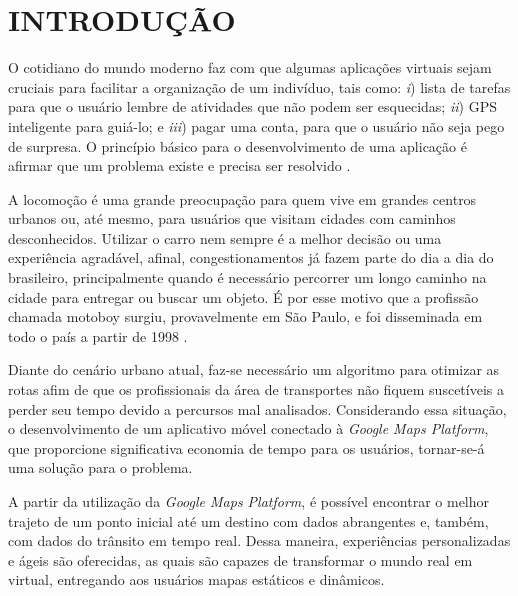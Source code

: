 
\chapter{INTRODUÇÃO}

O cotidiano do mundo moderno faz com que algumas aplicações virtuais sejam cruciais para facilitar a organização de um indivíduo, tais como: \textit{i}) lista de tarefas para que o usuário lembre de atividades que não podem ser esquecidas; \textit{ii}) GPS inteligente para guiá-lo; e \textit{iii}) pagar uma conta, para que o usuário não seja pego de surpresa. O princípio básico para o desenvolvimento de uma aplicação é afirmar que um problema existe e precisa ser resolvido \cite{desenvWebFrame}.

A locomoção é uma grande preocupação para quem vive em grandes centros urbanos ou, até mesmo, para usuários que visitam cidades com caminhos desconhecidos. Utilizar o carro nem sempre é a melhor decisão ou uma experiência agradável, afinal, congestionamentos já fazem parte do dia a dia do brasileiro, principalmente quando é necessário percorrer um longo caminho na cidade para entregar ou buscar um objeto. É por esse motivo que a profissão chamada motoboy surgiu, provavelmente em São Paulo, e foi disseminada em todo o país a partir de 1998 \cite{MotoboyVeja}.

Diante do cenário urbano atual, faz-se necessário um algoritmo para otimizar as rotas afim de que os profissionais da área de transportes não fiquem suscetíveis a perder seu tempo devido a percursos mal analisados. Considerando essa situação, o desenvolvimento de um aplicativo móvel conectado à \textit{Google Maps Platform}, que proporcione significativa economia de tempo para os usuários, tornar-se-á uma solução para o problema.

A partir da utilização da \textit{Google Maps Platform}, é possível encontrar o melhor trajeto de um ponto inicial até um destino com dados abrangentes e, também, com dados do trânsito em tempo real. Dessa maneira, experiências personalizadas e ágeis são oferecidas, as quais são capazes de transformar o mundo real em virtual, entregando aos usuários mapas estáticos e dinâmicos. 

